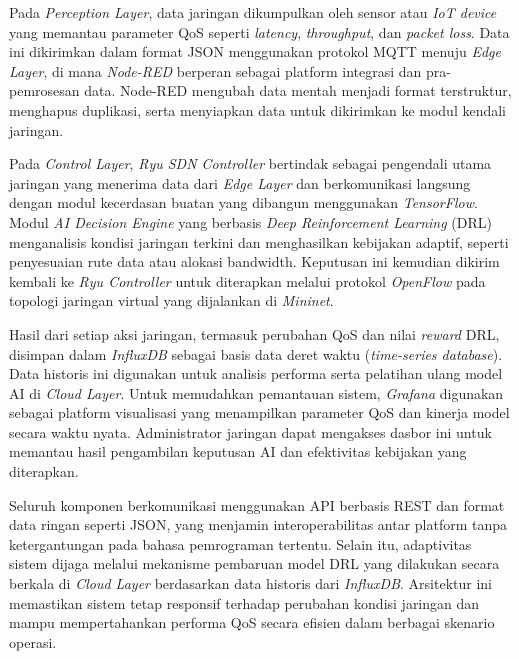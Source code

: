 \documentclass[a4paper,conference]{IEEEtran}
\begin{document}
Pada \textit{Perception Layer}, data jaringan dikumpulkan oleh sensor atau \textit{IoT device} yang memantau parameter QoS seperti \textit{latency}, \textit{throughput}, dan \textit{packet loss}. Data ini dikirimkan dalam format JSON menggunakan protokol MQTT menuju \textit{Edge Layer}, di mana \textit{Node-RED} berperan sebagai platform integrasi dan pra-pemrosesan data. Node-RED mengubah data mentah menjadi format terstruktur, menghapus duplikasi, serta menyiapkan data untuk dikirimkan ke modul kendali jaringan.

Pada \textit{Control Layer}, \textit{Ryu SDN Controller} bertindak sebagai pengendali utama jaringan yang menerima data dari \textit{Edge Layer} dan berkomunikasi langsung dengan modul kecerdasan buatan yang dibangun menggunakan \textit{TensorFlow}. Modul \textit{AI Decision Engine} yang berbasis \textit{Deep Reinforcement Learning} (DRL) menganalisis kondisi jaringan terkini dan menghasilkan kebijakan adaptif, seperti penyesuaian rute data atau alokasi bandwidth. Keputusan ini kemudian dikirim kembali ke \textit{Ryu Controller} untuk diterapkan melalui protokol \textit{OpenFlow} pada topologi jaringan virtual yang dijalankan di \textit{Mininet}.

Hasil dari setiap aksi jaringan, termasuk perubahan QoS dan nilai \textit{reward} DRL, disimpan dalam \textit{InfluxDB} sebagai basis data deret waktu (\textit{time-series database}). Data historis ini digunakan untuk analisis performa serta pelatihan ulang model AI di \textit{Cloud Layer}. Untuk memudahkan pemantauan sistem, \textit{Grafana} digunakan sebagai platform visualisasi yang menampilkan parameter QoS dan kinerja model secara waktu nyata. Administrator jaringan dapat mengakses dasbor ini untuk memantau hasil pengambilan keputusan AI dan efektivitas kebijakan yang diterapkan.

Seluruh komponen berkomunikasi menggunakan API berbasis REST dan format data ringan seperti JSON, yang menjamin interoperabilitas antar platform tanpa ketergantungan pada bahasa pemrograman tertentu. Selain itu, adaptivitas sistem dijaga melalui mekanisme pembaruan model DRL yang dilakukan secara berkala di \textit{Cloud Layer} berdasarkan data historis dari \textit{InfluxDB}. Arsitektur ini memastikan sistem tetap responsif terhadap perubahan kondisi jaringan dan mampu mempertahankan performa QoS secara efisien dalam berbagai skenario operasi.
\end{document}

